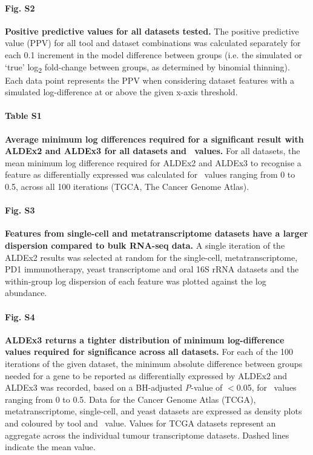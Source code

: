 \documentclass[10pt,letterpaper]{article}
\begin{document}
\paragraph*{Fig. S2}
\label{fig:supFigPPV}
\textbf{Positive predictive values for all datasets tested.} The positive predictive value (PPV) for all tool and dataset combinations was calculated separately for each 0.1 increment in the model difference between groups (i.e. the simulated or `true' log\textsubscript{2} fold-change between groups, as determined by binomial thinning). Each data point represents the PPV when considering dataset features with a simulated log-difference at or above the given x-axis threshold.

\paragraph*{Table S1}
\label{tab:supTabDensity}
\textbf{Average minimum log differences required for a significant result with ALDEx2 and ALDEx3 for all datasets and \textgamma~values.} For all datasets, the mean minimum log difference required for ALDEx2 and ALDEx3 to recognise a feature as differentially expressed was calculated for \textgamma~values ranging from 0 to 0.5, across all 100 iterations (TGCA, The Cancer Genome Atlas).

\paragraph*{Fig. S3}
\label{fig:supFigDispAbund}
\textbf{Features from single-cell and metatranscriptome datasets have a larger dispersion compared to bulk RNA-seq data.} A single iteration of the ALDEx2 results was selected at random for the single-cell, metatranscriptome, PD1 immunotherapy, yeast transcriptome and oral 16S rRNA datasets and the within-group log dispersion of each feature was plotted against the log abundance. 

\paragraph*{Fig. S4}
\label{fig:supFigDensity}
\textbf{ALDEx3 returns a tighter distribution of minimum log-difference values required for significance across all datasets.} For each of the 100 iterations of the given dataset, the minimum absolute difference between groups needed for a gene to be reported as differentially expressed by ALDEx2 and ALDEx3 was recorded, based on a BH-adjusted \textit{P}-value of $<$0.05, for \textgamma~values ranging from 0 to 0.5. Data for the Cancer Genome Atlas (TCGA), metatranscriptome, single-cell, and yeast datasets are expressed as density plots and coloured by tool and \textgamma~value. Values for TCGA datasets represent an aggregate across the individual tumour transcriptome datasets. Dashed lines indicate the mean value.
\end{document}
